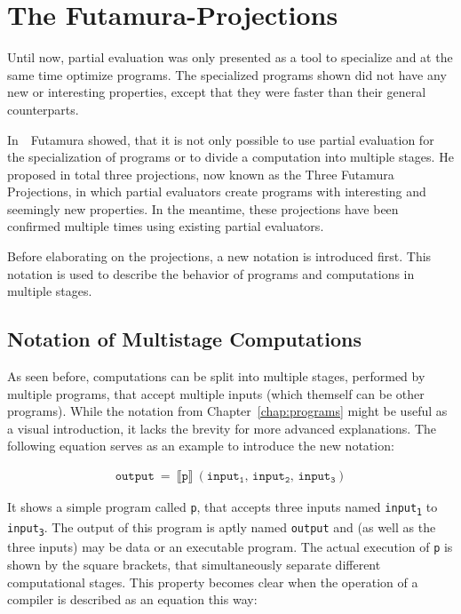
\section{The Futamura-Projections}\label{sec:futamura}

Until now, partial evaluation was only presented as a tool to specialize and at the same time optimize programs.
The specialized programs shown did not have any new or interesting properties, except that they were faster than their general counterparts.

In~\cite{Futamura_PECompilerCompiler}~Futamura showed, that it is not only possible to use partial evaluation for the specialization of programs or to divide a computation into multiple stages.
He proposed in total three projections, now known as the Three Futamura Projections, in which partial evaluators create programs with interesting and seemingly new properties.
In the meantime, these projections have been confirmed multiple times using existing partial evaluators.

Before elaborating on the projections, a new notation is introduced first.
This notation is used to describe the behavior of programs and computations in multiple stages.


\subsection{Notation of Multistage Computations}\label{sec:multistage-notation}

As seen before, computations can be split into multiple stages, performed by multiple programs, that accept multiple inputs (which themself can be other programs).
While the notation from Chapter~\ref{chap:programs} might be useful as a visual introduction, it lacks the brevity for more advanced explanations.
The following equation serves as an example to introduce the new notation:

\begin{align}
  \mathtt{output}\ =\
  \llbracket \mathtt{p} \rrbracket\ (\mathtt{input_1},\, \mathtt{input_2},\, \mathtt{input_3})
\end{align}

It shows a simple program called \texttt{p}, that accepts three inputs named \texttt{input\textsubscript{1}} to \texttt{input\textsubscript{3}}.
The output of this program is aptly named \texttt{output} and (as well as the three inputs) may be data or an executable program.
The actual execution of \texttt{p} is shown by the square brackets, that simultaneously separate different computational stages.
This property becomes clear when the operation of a compiler is described as an equation this way:

